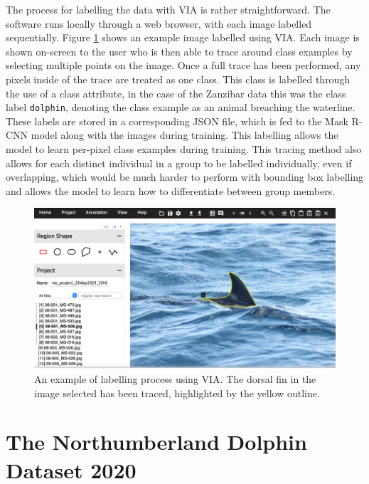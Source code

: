 The process for labelling the data with VIA is rather straightforward. The software runs locally through a web browser, with each image labelled sequentially. Figure \ref{fig:via-json-example-zanzibar} shows an example image labelled using VIA. Each image is shown on-screen to the user who is then able to trace around class examples by selecting multiple points on the image. Once a full trace has been performed, any pixels inside of the trace are treated as one class. This class is labelled through the use of a class attribute, in the case of the Zanzibar data this was the class label \texttt{dolphin}, denoting the class example as an animal breaching the waterline. These labels are stored in a corresponding JSON file, which is fed to the Mask R-CNN model along with the images during training. This labelling allows the model to learn per-pixel class examples during training. This tracing method also allows for each distinct individual in a group to be labelled individually, even if overlapping, which would be much harder to perform with bounding box labelling and allows the model to learn how to differentiate between group members.  

\begin{figure}
	\begin{center}
		\includegraphics[width=\linewidth]{Chapter3/figs/via-json-example-zanzibar-1-updated.png}
	\end{center}
	\caption[An example of the labelling process using VIA.]{An example of labelling process using VIA. The dorsal fin in the image selected has been traced, highlighted by the yellow outline.
	}
	\label{fig:via-json-example-zanzibar}
\end{figure}

\section{The Northumberland Dolphin Dataset 2020}\label{ch:datasetCreation,sec:NDD}

